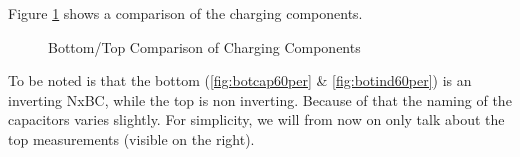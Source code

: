Figure \ref{fig:bottopcharge} shows a comparison of the charging components.

\begin{figure}[H]%
    \centering
   \qquad
    \caption{Bottom/Top Comparison of Charging Components}%
     \label{fig:bottopcharge}%
\end{figure}

To be noted is that the bottom (\ref{fig:botcap60per} \& \ref{fig:botind60per}) is an inverting NxBC,
while the top is non inverting.
Because of that the naming of the capacitors varies slightly.
For simplicity,
we will from now on only talk about the top measurements (visible on the right).

